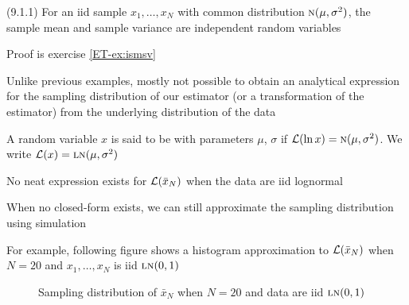 \begin{frame}

    \vspace{2em}
    \Fact (9.1.1)
    For an {\sc iid} sample $x_1, \ldots,
    x_N$ with common distribution $\textrm{\sc n}(\mu, \sigma^2)$, the sample mean 
    and sample variance are independent random variables

    Proof is exercise \ref{ET-ex:ismsv}
    
\end{frame}

\begin{frame}
    
    \vspace{2em}
    Unlike previous examples, mostly not possible to obtain an 
    analytical expression for
    the sampling distribution of our estimator (or a transformation of the
    estimator) from the underlying distribution of the data
    
    \vspace{.7em}
    \Eg
    A random variable $x$ is said to be  with
    parameters $\mu$, $\sigma$ if $\mathcal L(\ln x) = \textrm{\sc n}(\mu, \sigma^2)$.  We write
    $\mathcal L(x) = \textrm{\sc ln}(\mu, \sigma^2)$
    
    No neat expression exists for 
    $\mathcal L(\bar x_N)$ when the data are {\sc iid} lognormal

\end{frame}

\begin{frame}

    \vspace{2em}
    When no closed-form exists, we can still approximate the sampling distribution
    using simulation
    
    \vspace{.7em}
    For example, following figure
    shows a histogram approximation to $\mathcal L(\bar x_N)$ when $N=20$ and 
    $x_1, \ldots, x_N$ is {\sc iid} $\textrm{\sc ln}(0, 1)$
    
\end{frame}

\begin{frame}
    \begin{figure}
    \centering
    \caption{\label{f:lognorm_sample_mean} Sampling distribution of $\bar x_N$
    when $N=20$ and data are {\sc iid} $\textrm{\sc ln}(0, 1)$}
    \end{figure}
    
\end{frame}

